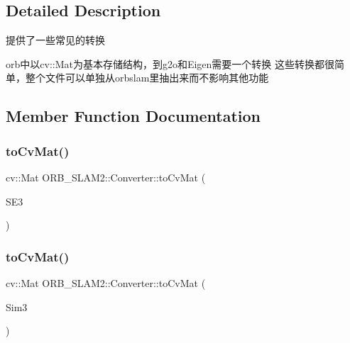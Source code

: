 \subsection{Detailed Description}
提供了一些常见的转换 

orb中以cv\+::\+Mat为基本存储结构，到g2o和\+Eigen需要一个转换 这些转换都很简单，整个文件可以单独从orbslam里抽出来而不影响其他功能 

\subsection{Member Function Documentation}
\mbox{\label{class_o_r_b___s_l_a_m2_1_1_converter_ac9d5a9ea7de26d34047aa0afddaa2091}} 
\subsubsection{\texorpdfstring{to\+Cv\+Mat()}{toCvMat()}\hspace{0.1cm}{\footnotesize\ttfamily [1/5]}}
{\footnotesize\ttfamily cv\+::\+Mat O\+R\+B\+\_\+\+S\+L\+A\+M2\+::\+Converter\+::to\+Cv\+Mat (\begin{DoxyParamCaption}\item[{const \mbox{\hyperlink{classg2o_1_1_s_e3_quat}{g2o\+::\+S\+E3\+Quat}} \&}]{S\+E3 }\end{DoxyParamCaption})\hspace{0.3cm}{\ttfamily [static]}}

\mbox{\label{class_o_r_b___s_l_a_m2_1_1_converter_a4bc1702afbd33a5d90d39f1940157e08}} 
\subsubsection{\texorpdfstring{to\+Cv\+Mat()}{toCvMat()}\hspace{0.1cm}{\footnotesize\ttfamily [2/5]}}
{\footnotesize\ttfamily cv\+::\+Mat O\+R\+B\+\_\+\+S\+L\+A\+M2\+::\+Converter\+::to\+Cv\+Mat (\begin{DoxyParamCaption}\item[{const \mbox{\hyperlink{structg2o_1_1_sim3}{g2o\+::\+Sim3}} \&}]{Sim3 }\end{DoxyParamCaption})\hspace{0.3cm}{\ttfamily [static]}}

